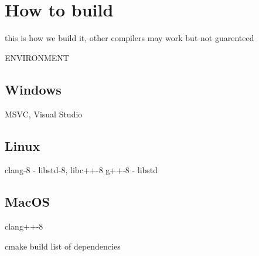 \chapter{How to build}

this is how we build it, other compilers may work but not guarenteed

ENVIRONMENT
\section{Windows}
MSVC, Visual Studio
\section{Linux}
clang-8 - libstd-8, libc++-8
g++-8 - libstd

\section{MacOS}
clang++-8

cmake build
list of dependencies